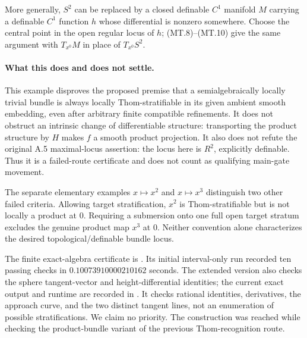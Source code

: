 More generally, $S^2$ can be replaced by a closed definable
$C^1$ manifold $M$ carrying a definable $C^1$ function $h$ whose
differential is nonzero somewhere. Choose the central point in
the open regular locus of $h$; (MT.8)--(MT.10) give the same
argument with $T_{x^0}M$ in place of $T_{x^0}S^2$.

\paragraph{What this does and does not settle.}
This example disproves the proposed premise that a semialgebraically
locally trivial bundle is always locally Thom-stratifiable in its
given ambient smooth embedding, even after arbitrary finite
compatible refinements. It does not obstruct an intrinsic change
of differentiable structure: transporting the product structure by
$H$ makes $f$ a smooth product projection. It also does not refute
the original A.5 maximal-locus assertion: the locus here is $R^2$,
explicitly definable. Thus it is a failed-route certificate and
does not count as qualifying main-gate movement.

The separate elementary examples $x\mapsto x^2$ and $x\mapsto x^3$
distinguish two other failed criteria. Allowing target stratification,
$x^2$ is Thom-stratifiable but is not locally a product at $0$.
Requiring a submersion onto one full open target stratum excludes
the genuine product map $x^3$ at $0$. Neither convention alone
characterizes the desired topological/definable bundle locus.

The finite exact-algebra certificate is
.
Its initial interval-only run recorded ten passing checks in
$0.10073910000210162$ seconds. The extended version also checks
the sphere tangent-vector and height-differential identities;
the current exact output and runtime are recorded in
.
It checks rational
identities, derivatives, the approach curve, and the two distinct
tangent lines, not an enumeration of possible stratifications.
We claim no priority. The construction was reached while checking
the product-bundle variant of the previous Thom-recognition route.
